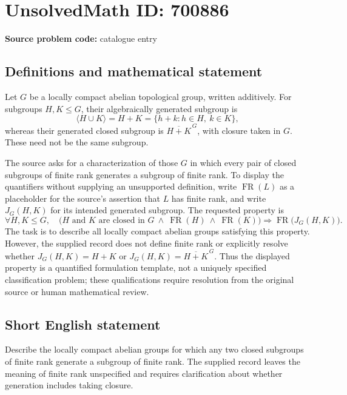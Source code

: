 \documentclass[11pt]{article}
\begin{document}
\section*{UnsolvedMath ID: 700886}
\textbf{Source problem code:} catalogue entry
\subsection{Definitions and mathematical statement}
Let \(G\) be a locally compact abelian topological group, written additively. For subgroups \(H,K\leq G\), their algebraically generated subgroup is
\[
\langle H\cup K\rangle=H+K=\{h+k:h\in H,\ k\in K\},
\]
whereas their generated closed subgroup is \(\overline{H+K}^{\,G}\), with closure taken in \(G\). These need not be the same subgroup.

The source asks for a characterization of those \(G\) in which every pair of closed subgroups of finite rank generates a subgroup of finite rank. To display the quantifiers without supplying an unsupported definition, write \(\operatorname{FR}(L)\) as a placeholder for the source's assertion that \(L\) has finite rank, and write \(J_G(H,K)\) for its intended generated subgroup. The requested property is
\[
\forall H,K\leq G,\quad
\bigl(H\text{ and }K\text{ are closed in }G
\ \land\ \operatorname{FR}(H)\ \land\ \operatorname{FR}(K)\bigr)
\Longrightarrow \operatorname{FR}\bigl(J_G(H,K)\bigr).
\]
The task is to describe all locally compact abelian groups satisfying this property. However, the supplied record does not define finite rank or explicitly resolve whether \(J_G(H,K)=H+K\) or \(J_G(H,K)=\overline{H+K}^{\,G}\). Thus the displayed property is a quantified formulation template, not a uniquely specified classification problem; these qualifications require resolution from the original source or human mathematical review.
\subsection{Short English statement}
Describe the locally compact abelian groups for which any two closed subgroups of finite rank generate a subgroup of finite rank. The supplied record leaves the meaning of finite rank unspecified and requires clarification about whether generation includes taking closure.
\end{document}
